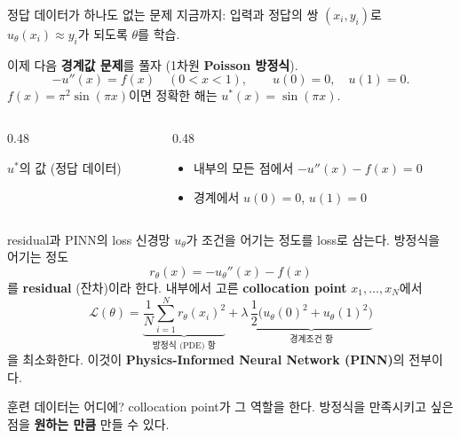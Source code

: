 \documentclass[aspectratio=169,11pt]{beamer}
\newcommand{\loss}{\mathcal{L}}
\begin{document}
\begin{frame}{정답 데이터가 하나도 없는 문제}
지금까지: 입력과 정답의 쌍 $(x_i,y_i)$로 $u_\theta(x_i)\approx y_i$가 되도록 $\theta$를 학습.

\vskip2mm
이제 다음 \textbf{경계값 문제}를 풀자 (1차원 \textbf{Poisson 방정식}).
\[
-u''(x)=f(x)\quad (0<x<1),\qquad u(0)=0,\quad u(1)=0.
\]
$f(x)=\pi^2\sin(\pi x)$이면 정확한 해는 $u^*(x)=\sin(\pi x)$.

\vskip2mm
\begin{columns}[T,onlytextwidth]
\begin{column}{0.48\textwidth}
\begin{remarkbox}[없는 것]
$u^*$의 값 (정답 데이터)
\end{remarkbox}
\end{column}
\begin{column}{0.48\textwidth}
\begin{keybox}[아는 것: 해가 만족할 조건]
\begin{itemize}
\item 내부의 모든 점에서 $-u''(x)-f(x)=0$
\item 경계에서 $u(0)=0$, $u(1)=0$
\end{itemize}
\end{keybox}
\end{column}
\end{columns}
\end{frame}

\begin{frame}{residual과 PINN의 loss}
신경망 $u_\theta$가 조건을 어기는 정도를 loss로 삼는다. 방정식을 어기는 정도
\[
r_\theta(x)=-u_\theta''(x)-f(x)
\]
를 \textbf{residual} (잔차)이라 한다. 내부에서 고른 \textbf{collocation point} $x_1,\dots,x_N$에서
\[
\loss(\theta)=\underbrace{\frac1N\sum_{i=1}^N r_\theta(x_i)^2}_{\text{방정식 (PDE) 항}}
+\lambda\,\underbrace{\frac12\Big(u_\theta(0)^2+u_\theta(1)^2\Big)}_{\text{경계조건 항}}
\]
을 최소화한다. 이것이 \textbf{Physics-Informed Neural Network (PINN)}의 전부이다.

\vskip2mm
\begin{keybox}
훈련 데이터는 어디에? collocation point가 그 역할을 한다. 방정식을 만족시키고 싶은 점을 \textbf{원하는 만큼} 만들 수 있다.
\end{keybox}
\end{frame}
\end{document}
